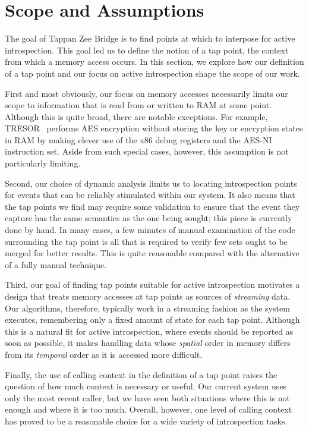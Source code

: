 \section{Scope and Assumptions}
\label{sec:scope}

The goal of Tappan Zee Bridge is to find points at which to interpose
for active introspection. This goal led us to define the notion of a tap
point, the context from which a memory access occurs. In this section,
we explore how our definition of a tap point and our focus on active
introspection shape the scope of our work.

First and most obviously, our focus on memory accesses necessarily
limits our scope to information that is read from or written to RAM at
some point. Although this is quite broad, there are notable exceptions.
For example, TRESOR~\cite{Muller:2011} performs AES encryption without
storing the key or encryption states in RAM by making clever use of the
x86 debug registers and the AES-NI instruction set. Aside from such
special cases, however, this assumption is not particularly limiting.

Second, our choice of dynamic analysis limits us to locating
introspection points for events that can be reliably stimulated within
our system. It also means that the tap points we find may require some
validation to ensure that the event they capture has the same semantics
as the one being sought; this piece is currently done by hand.
In many cases, a few minutes of manual examination of the code
surrounding the tap point is all that is required to verify few sets
ought to be merged for better results. This is quite reasonable
compared with the alternative of a fully manual technique.

Third, our goal of finding tap points suitable for active introspection
motivates a design that treats memory accesses at tap points as sources
of \emph{streaming} data. Our algorithms, therefore, typically work in a
streaming fashion as the system executes, remembering only a fixed
amount of state for each tap point. Although this is a natural fit for
active introspection, where events should be reported as soon as
possible, it makes handling data whose \emph{spatial} order in memory
differs from its \emph{temporal} order as it is accessed more difficult.

Finally, the use of calling context in the definition of a tap point
raises the question of how much context is necessary or useful. Our
current system uses only the most recent caller, but we have seen
both situations where this is not enough and where it is too much.
Overall, however, one level of calling context has proved to be a
reasonable choice for a wide variety of introspection tasks.

